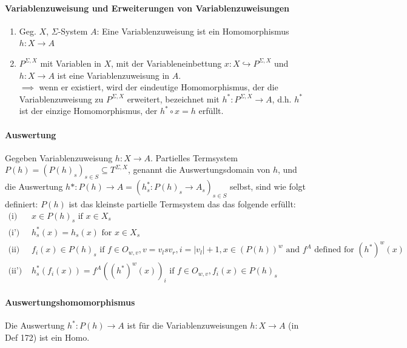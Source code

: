 \paragraph{ Variablenzuweisung und Erweiterungen von Variablenzuweisungen} 
\begin{enumerate}
\item Geg. $X$, $\Sigma$-System $A$: Eine Variablenzuweisung ist ein Homomorphismus $h: X \rightarrow A$
\item $P^{\Sigma,X}$ mit Variablen in $X$, mit der Variableneinbettung $x: X \hookrightarrow P^{\Sigma,X}$ und $h: X \rightarrow A$ ist eine Variablenzuweisung in $A$. \\
$\implies$ wenn er existiert, wird der eindeutige Homomorphismus, der die Variablenzuweisung zu $P^{\Sigma,X}$ erweitert,  bezeichnet mit $h^*: P^{\Sigma,X} \rightarrow A$, d.h. $h^*$ ist der einzige Homomorphismus, der $h^* \circ x = h $ erfüllt.
\end{enumerate}

\paragraph{ Auswertung} 
Gegeben Variablenzuweisung $h: X \rightarrow A$. Partielles Termsystem $P(h) = (P(h)_s)_{s \in S} \subseteq T^{\Sigma,X}$, genannt die Auswertungsdomain von $h$, und die Auswertung $h*: P(h) \rightarrow A = (h_s^*: P(h)_s \rightarrow A_s)_{s \in S}$ selbst, sind wie folgt definiert:
$P(h)$ ist das kleinste partielle Termsystem das das folgende erfüllt: 
\begin{align*}
\textrm{(i) } & x\in P(h)_{s}\textrm{ if }x\in X_{s}\\
\textrm{(i') } & h_{s}^{*}(x)=h_{s}(x)\textrm{ for }x\in X_{s}\\
\textrm{(ii) } & f_{i}(x)\in P(h)_{s}\textrm{ if }f\in O_{w,v},v=v_{l}sv_{r},i=|v_{l}|+1,x\in\left(P(h)\right)^{w}\textrm{ and }f^{A}\textrm{ defined }\textrm{for }\left(h^{*}\right)^{w}(x)\\
\textrm{(ii') } & h_{s}^{*}(f_{i}(x))=f^{A}\left(\left(h^{*}\right)^{w}(x)\right)_{i}\textrm{ if }f\in O_{w,v},f_{i}(x)\in P(h)_{s}
\end{align*}

\paragraph{ Auswertungshomomorphismus}
Die Auswertung $h^*: P(h) \rightarrow A$ ist für die Variablenzuweisungen $h: X \rightarrow A$ (in Def 172) ist ein Homo.
 

